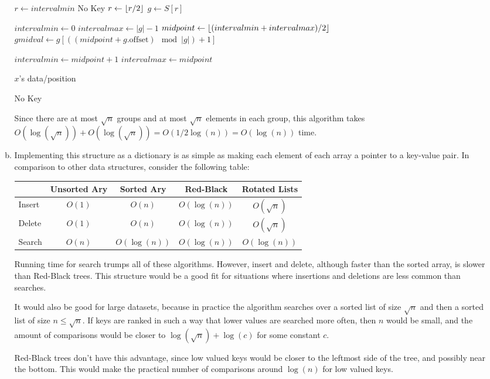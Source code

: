 \documentclass[letterpaper,10pt]{article}
\DeclarePairedDelimiter{\floor}{\lfloor}{\rfloor}
\begin{document}
\begin{enumerate}
\begin{enumerate}[a)]
\begin{algorithmic}
			\State $r \gets intervalmin$
				\State \Return No Key
			\EndIf
			\State $r \gets \floor{r/2}$
			\State $g \gets S[r]$


			\State $intervalmin \gets 0$
			\State $intervalmax \gets |g|-1$
				\State $midpoint \gets \floor{(intervalmin + intervalmax)/2}$
				\State $gmidval \gets g[((midpoint+g.\text{offset}) \mod |g|) + 1] $

					\State $intervalmin \gets midpoint+1$
				\Else
					\State $intervalmax \gets midpoint$
				\EndIf
			\EndWhile

				\Return $x$'s data/position
			\EndIf

			\State \Return No Key
		\EndFunction
		\end{algorithmic}

		Since there are at most $\sqrt{n}$ groups and at most $\sqrt{n}$ elements in each group, this algorithm takes $O(\log(\sqrt{n}))+O(\log(\sqrt{n})) = O(1/2 \log(n)) = O(\log(n))$ time.

		\item Implementing this structure as a dictionary is as simple as making each element of each array a pointer to a key-value pair. In comparison to other data structures, consider the following table:

		\begin{tabular}{|l|c|c|c|c|}
		  \hline
		   & Unsorted Ary & Sorted Ary & Red-Black & Rotated Lists \\
		  \hline \hline
		  Insert & $O(1)$ & $O(n)$ & $O(\log(n))$ & $O(\sqrt{n})$ \\
		  \hline
		  Delete & $O(1)$ & $O(n)$ & $O(\log(n))$ & $O(\sqrt{n})$ \\
		  \hline
		  Search & $O(n)$ & $O(\log(n))$ & $O(\log(n))$ & $O(\log(n))$ \\
		  \hline
		\end{tabular}

		Running time for search trumps all of these algorithms. However, insert and delete, although faster than the sorted array, is slower than Red-Black trees. This structure would be a good fit for situations where insertions and deletions are less common than searches.

		It would also be good for large datasets, because in practice the algorithm searches over a sorted list of size $\sqrt{n}$ and then a sorted list of size $n \leq \sqrt{n}$. If keys are ranked in such a way that lower values are searched more often, then $n$ would be small, and the amount of comparisons would be closer to $\log(\sqrt{n}) + \log(c)$ for some constant $c$.

		Red-Black trees don't have this advantage, since low valued keys would be closer to the leftmost side of the tree, and possibly near the bottom. This would make the practical number of comparisons around $\log(n)$ for low valued keys.

	\end{enumerate}

\end{enumerate}
\end{document}
